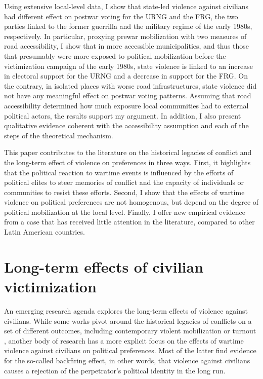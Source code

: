 \documentclass[12pt, notitlepage]{article}
\begin{document}
Using extensive local-level data, I show that state-led violence against civilians had different effect on postwar voting for the URNG and the FRG, the two parties linked to the former guerrilla and the military regime of the early 1980s, respectively.
In particular, proxying prewar mobilization with two measures of road accessibility, I show that in more accessible municipalities, and thus those that presumably were more exposed to political mobilization before the victimization campaign of the early 1980s, state violence is linked to an increase in electoral support for the URNG and a decrease in support for the FRG.
On the contrary, in isolated places with worse road infrastructures, state violence did not have any meaningful effect on postwar voting patterns.
Assuming that road accessibility determined how much exposure local communities had to external political actors, the results support my argument.
In addition, I also present qualitative evidence coherent with the accessibility assumption and each of the steps of the theoretical mechanism.

This paper contributes to the literature on the historical legacies of conflict \citep{Daly:2012aa, Weintraub:2015aa, Osorio:2018aa, Zhukov:2018aa, Osorio:2021aa} and the long-term effect of violence on preferences \citep{Balcells:2012aa, Lupu:2017aa, Fontana:2017aa, Rozenas:2017aa, Rozenas:2019aa} in three ways.
First, it highlights that the political reaction to wartime events is influenced by the efforts of political elites to steer memories of conflict and the capacity of individuals or communities to resist these efforts.
Second, I show that the effects of wartime violence on political preferences are not homogenous, but depend on the degree of political mobilization at the local level.
Finally, I offer new empirical evidence from a case that has received little attention in the literature, compared to other Latin American countries.

\section*{Long-term effects of civilian victimization}

An emerging research agenda explores the long-term effects of violence against civilians.
While some works pivot around the historical legacies of conflicts on a set of different outcomes, including contemporary violent mobilization or turnout \citep{Daly:2012aa, Weintraub:2015aa, Osorio:2018aa, Zhukov:2018aa, Osorio:2021aa}, another body of research has a more explicit focus on the effects of wartime violence against civilians on political preferences.
Most of the latter find evidence for the so-called backfiring effect, in other words, that violence against civilians causes a rejection of the perpetrator's political identity in the long run.
\end{document}
